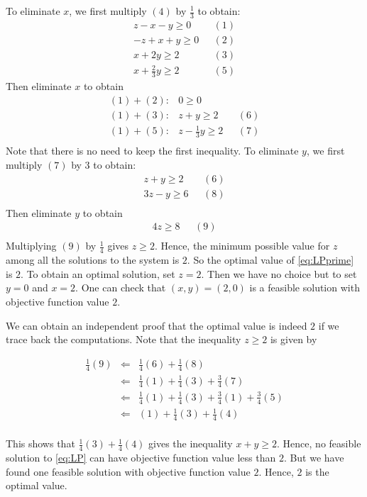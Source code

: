 To eliminate \(x\), we first multiply \((4)\) by \(\frac{1}{3}\) to
obtain: \[
\begin{array}{rl}
 z - x - y \geq 0 & ~~~(1) \\
-z + x + y \geq 0 & ~~~(2) \\
 x + 2y  \geq 2 &~~~(3)\\
 x + \frac{2}{3}y  \geq 2 & ~~~(5)
\end{array}
\] Then eliminate \(x\) to obtain \[
\begin{array}{rrl}
(1) + (2):  & 0 \geq 0 \\
(1) + (3):  & z + y \geq 2 & ~~~(6) \\
(1) + (5):  & z - \frac{1}{3} y \geq 2 & ~~~(7) \\
\end{array}
\] Note that there is no need to keep the first inequality. To eliminate
\(y\), we first multiply \((7)\) by \(3\) to obtain: \[
\begin{array}{rl}
  z + y \geq 2 & ~~~(6) \\
  3z - y \geq 6 & ~~~(8) \\
\end{array}
\] Then eliminate \(y\) to obtain \[
\begin{array}{rl}
  4z \geq 8 & ~~~(9) \\
\end{array}
\] Multiplying \((9)\) by \(\frac{1}{4}\) gives \(z \geq 2\). Hence, the
minimum possible value for \(z\) among all the solutions to the system
is \(2\). So the optimal value of \eqref{eq:LPprime} is \(2\). To obtain
an optimal solution, set \(z = 2\). Then we have no choice but to set
\(y = 0\) and \(x = 2\). One can check that \((x,y) = (2,0)\) is a
feasible solution with objective function value \(2\).

We can obtain an independent proof that the optimal value is indeed
\(2\) if we trace back the computations. Note that the inequality
\(z \geq 2\) is given by

\begin{eqnarray*}
\frac{1}{4} (9) 
& \Leftarrow & \frac{1}{4} (6) + \frac{1}{4} (8) \\
& \Leftarrow & \frac{1}{4} (1)+\frac{1}{4}(3) + \frac{3}{4}(7) \\
& \Leftarrow & \frac{1}{4} (1)+\frac{1}{4}(3) + \frac{3}{4}(1)+\frac{3}{4}(5) \\
& \Leftarrow & (1)+ \frac{1}{4}(3) + \frac{1}{4} (4)  \\
\end{eqnarray*}

This shows that \(\frac{1}{4}(3) + \frac{1}{4} (4)\) gives the
inequality \(x+y \geq 2\). Hence, no feasible solution to \eqref{eq:LP}
can have objective function value less than \(2\). But we have found one
feasible solution with objective function value \(2\). Hence, \(2\) is
the optimal value.
